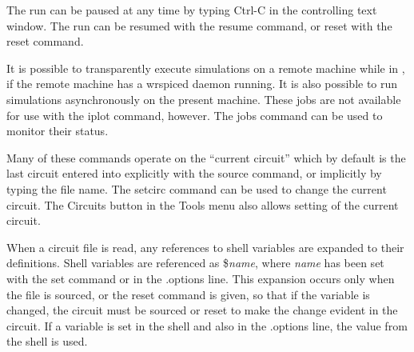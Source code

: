 The run can be paused at any time by typing {\kb Ctrl-C} in the
controlling text window.  The run can be resumed with the {\cb resume}
command, or reset with the {\cb reset} command.

It is possible to transparently execute simulations on a remote
machine while in {\WRspice}, if the remote machine has a {\vt
wrspiced} daemon running.  It is also possible to run simulations
asynchronously on the present machine.  These jobs are not available
for use with the {\cb iplot} command, however.  The {\cb jobs} command
can be used to monitor their status.

Many of these commands operate on the ``current circuit'' which by
default is the last circuit entered into {\WRspice} explicitly with
the {\cb source} command, or implicitly by typing the file name.  The
{\cb setcirc} command can be used to change the current circuit.  The
{\cb Circuits} button in the {\cb Tools} menu also allows setting of
the current circuit.

When a circuit file is read, any references to shell variables are
expanded to their definitions.  Shell variables are referenced as {\vt
\$}{\it name}, where {\it name} has been set with the {\cb set}
command or in the {\vt .options} line.  This expansion occurs only
when the file is sourced, or the {\cb reset} command is given, so that
if the variable is changed, the circuit must be sourced or reset to
make the change evident in the circuit.  If a variable is set in the
shell and also in the {\vt .options} line, the value from the shell
is used.

